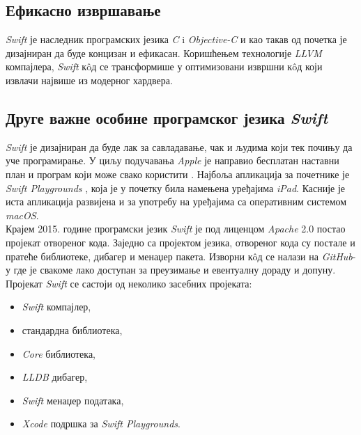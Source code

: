 \documentclass[12pt,oneside]{memoir}
\begin{document}
\subsection{Ефикасно извршавање}

\indent \textit{Swift} је наследник програмских језика \textit{C} i \textit{Objective-C} и као такав од почетка је дизајниран да буде концизан и ефикасан. Коришћењем технологије \textit{LLVM} компајлера, \textit{Swift} к\^{o}д се трансформише у оптимизовани извршни к\^{o}д који извлачи највише из модерног хардвера. 

\subsection{Друге важне особине програмског језика \textit{Swift}}

\indent \textit{Swift} је дизајниран да буде лак за савладавање, чак и људима који тек почињу да уче програмирање. У циљу подучавања \textit{Apple} је направио бесплатан наставни план и програм који може свако користити \cite{Swift_Education}. Најбоља апликација за почетнике је \textit{Swift Playgrounds} \cite{Swift_Playground}, која је у почетку била намењена уређајима \textit{iPad}. Касније је иста апликација развијена и за употребу на уређајима са оперативним системом \textit{macOS}. 
\\
\indent Крајем 2015. године програмски језик \textit{Swift} је под лиценцом \textit{Apache} 2.0 постао пројекат отвореног кода. Заједно са пројектом језика, отвореног кода су постале и пратеће библиотеке, дибагер и менаџер пакета. Изворни к\^{o}д се налази на \textit{GitHub}-у где је свакоме лако доступан за преузимање и евентуалну дораду и допуну. Пројекат \textit{Swift} се састоји од неколико засебних пројеката: 
\begin{itemize}
    \item \textit{Swift} компајлер,
    \item стандардна библиотека,
    \item \textit{Core} библиотека,
    \item \textit{LLDB} дибагер,
    \item \textit{Swift} менаџер података,
    \item \textit{Xcode} подршка за \textit{Swift Playgrounds}.
\end{itemize}
\end{document}
